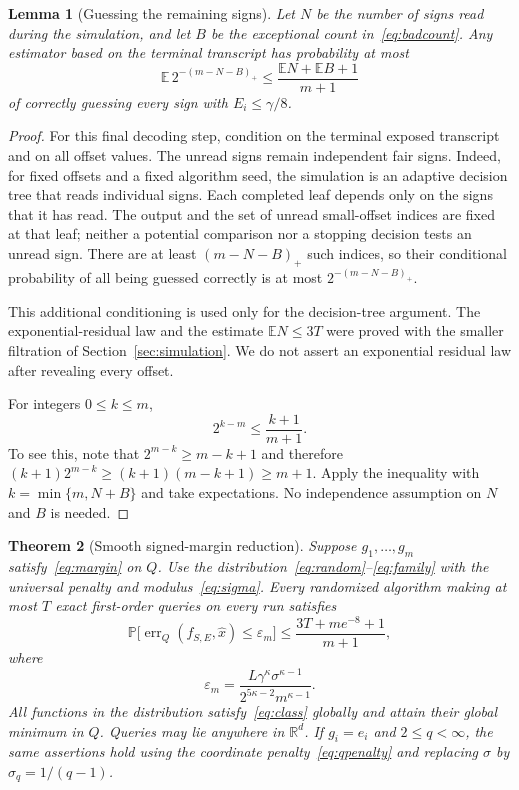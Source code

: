\documentclass[11pt,a4paper]{article}
\newtheorem{theorem}{Theorem}[section]
\newtheorem{lemma}[theorem]{Lemma}
\theoremstyle{definition}
\theoremstyle{remark}
\newcommand{\R}{\mathbb R}
\newcommand{\E}{\mathbb E}
\newcommand{\Prb}{\mathbb P}
\newcommand{\eps}{\varepsilon}
\DeclareMathOperator{\err}{err}
\begin{document}
\begin{lemma}[Guessing the remaining signs]\label{lem:guess}
Let $N$ be the number of signs read during the simulation, and let $B$ be
the exceptional count in~\eqref{eq:badcount}. Any estimator based on the
terminal transcript has probability at most
\begin{equation}\label{eq:guess}
 \E\,2^{-(m-N-B)_+}
 \le\frac{\E N+\E B+1}{m+1}
\end{equation}
of correctly guessing every sign with $E_i\le\gamma/8$.
\end{lemma}

\begin{proof}
For this final decoding step, condition on the terminal exposed transcript
and on all offset values. The unread signs remain independent fair signs.
Indeed, for fixed offsets and a fixed algorithm seed, the simulation is an
adaptive decision tree that reads individual signs. Each completed leaf
depends only on the signs that it has read. The output and the set of unread
small-offset indices are fixed at that leaf; neither a potential comparison
nor a stopping decision tests an unread sign. There are at least
$(m-N-B)_+$ such indices, so their conditional probability of all being
guessed correctly is at most $2^{-(m-N-B)_+}$.

This additional conditioning is used only for the decision-tree argument.
The exponential-residual law and the estimate $\E N\le3T$ were proved with
the smaller filtration of Section~\ref{sec:simulation}. We do not assert an
exponential residual law after revealing every offset.

For integers $0\le k\le m$,
\[
  2^{k-m}\le\frac{k+1}{m+1}.
\]
To see this, note that $2^{m-k}\ge m-k+1$ and therefore
$(k+1)2^{m-k}\ge(k+1)(m-k+1)\ge m+1$.
Apply the inequality with $k=\min\{m,N+B\}$ and take expectations.
No independence assumption on $N$ and $B$ is needed.
\end{proof}

\begin{theorem}[Smooth signed-margin reduction]\label{thm:transfer}
Suppose $g_1,\ldots,g_m$ satisfy~\eqref{eq:margin} on $Q$.
Use the distribution~\eqref{eq:random}--\eqref{eq:family} with the universal
penalty and modulus~\eqref{eq:sigma}. Every randomized algorithm making at
most $T$ exact first-order queries on every run satisfies
\begin{equation}\label{eq:prob}
 \Prb\bigl[\err_Q(f_{S,E},\widehat x)\le\eps_m\bigr]
 \le\frac{3T+me^{-8}+1}{m+1},
\end{equation}
where
\begin{equation}\label{eq:epsilon-margin}
 \eps_m=
 \frac{L\gamma^\kappa\sigma^{\kappa-1}}
      {2^{5\kappa-2}m^{\kappa-1}}.
\end{equation}
All functions in the distribution satisfy~\eqref{eq:class} globally and
attain their global minimum in $Q$. Queries may lie anywhere in $\R^d$.
If $g_i=e_i$ and $2\le q<\infty$, the same assertions hold using the
coordinate penalty~\eqref{eq:qpenalty} and replacing $\sigma$ by
$\sigma_q=1/(q-1)$.
\end{theorem}
\end{document}
